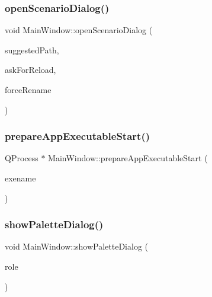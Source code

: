 \mbox{\label{class_main_window_a213af3deca59c1500e9f6e2804090b5f}} 
\subsubsection{\texorpdfstring{openScenarioDialog()}{openScenarioDialog()}}
{\footnotesize\ttfamily void Main\+Window\+::open\+Scenario\+Dialog (\begin{DoxyParamCaption}\item[{Q\+String}]{suggested\+Path,  }\item[{bool}]{ask\+For\+Reload,  }\item[{bool}]{force\+Rename }\end{DoxyParamCaption})\hspace{0.3cm}{\ttfamily [protected]}}

\mbox{\label{class_main_window_aa0b7790729f2570bdcada49bf7fda16e}} 
\subsubsection{\texorpdfstring{prepareAppExecutableStart()}{prepareAppExecutableStart()}}
{\footnotesize\ttfamily Q\+Process $\ast$ Main\+Window\+::prepare\+App\+Executable\+Start (\begin{DoxyParamCaption}\item[{Q\+String}]{exename }\end{DoxyParamCaption})\hspace{0.3cm}{\ttfamily [protected]}}

\mbox{\label{class_main_window_a5fe8e78a3a189e96c1214510997546e6}} 
\subsubsection{\texorpdfstring{showPaletteDialog()}{showPaletteDialog()}}
{\footnotesize\ttfamily void Main\+Window\+::show\+Palette\+Dialog (\begin{DoxyParamCaption}\item[{\mbox{\hyperlink{palettemanager_8h_adf4610684920d9165d0d74c1ea45b269}{Palette\+Role}}}]{role }\end{DoxyParamCaption})\hspace{0.3cm}{\ttfamily [protected]}}

